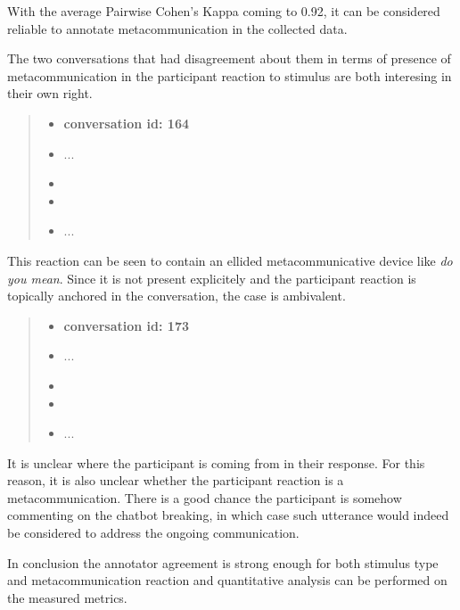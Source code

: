 With the average Pairwise Cohen's Kappa coming to 0.92,
it can be considered reliable to annotate metacommunication
in the collected data.

The two conversations that had disagreement about them in terms of
presence of metacommunication in the participant reaction to stimulus
are both interesing in their own right.


\begin{quote}
\begin{itemize}[label={}, leftmargin=0pt, itemsep=0.5em]
\item \textbf{conversation id: 164}
\item ...
\item {}
\item {}
\item ...
\end{itemize}
\end{quote}

This reaction can be seen to contain an ellided metacommunicative device like \textit{do you mean}.
Since it is not present explicitely and the participant reaction is topically anchored in the conversation,
the case is ambivalent.

\begin{quote}
\begin{itemize}[label={}, leftmargin=0pt, itemsep=0.5em]
\item \textbf{conversation id: 173}
\item ...
\item {}
\item {}
\item ...
\end{itemize}
\end{quote}

It is unclear where the participant is coming from in their response.
For this reason, it is also unclear whether the participant reaction is a metacommunication.
There is a good chance the participant is somehow commenting on the chatbot breaking,
in which case such utterance would indeed be considered to address the ongoing communication.

\par
In conclusion the annotator agreement is
strong enough for both stimulus type and metacommunication reaction and
quantitative analysis can be performed on the measured metrics.

